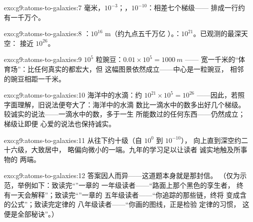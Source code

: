 \begin{solution}{exo:g9:atoms-to-galaxies:7}
毫米，$10^{-3}$；，$10^{-10}$：相差七个梯级——
排成一行约有一千万个。
\end{solution}

\begin{solution}{exo:g9:atoms-to-galaxies:8}
：$10^{16}$ \unit{m}（约九点五千万亿
）。：$10^{21}$。已观测的最深天空：
接近 $10^{26}$。
\end{solution}

\begin{solution}{exo:g9:atoms-to-galaxies:9}
$10^{5}$ 粒豌豆：$0.01 \times 10^{5} = \qty{1000}{m}$ ——
宽一千米的“体育场”：比任何真实的都宏大，但
这幅图景依然成立——中心是一粒豌豆，
相邻的豌豆相距一千米。
\end{solution}

\begin{solution}{exo:g9:atoms-to-galaxies:10}
海洋中的水滴：约 $10^{21} \times 10^{5} = 10^{26}$
——因此，若照字面理解，旧说法便夸大了：海洋中的水滴
数比一滴水中的数多出好几个梯级。
较诚实的说法——一滴水中的数，多于一生
所能数过的任何东西——仍然成立；梯级让即便
心爱的说法也保持诚实。
\end{solution}

\begin{solution}{exo:g9:atoms-to-galaxies:11}
从往下约十级（自 $10^{0}$ 到 $10^{-10}$），
向上直到深空约二十六级，大致居中，
略偏向微小的一端。九年的学习足以让读者
诚实地触及所事物的
两端。
\end{solution}

\begin{solution}{exo:g9:atoms-to-galaxies:12}
答案因人而异——这道题本身就是那封信。
（仅为示范，举例如下：致读完“”一章的
一年级读者——“路面上那个黑色的孪生者，
终有一天会解释”；致读完“”一章的
五年级读者——“你追踪的那些链，终将
变成含的公式”；致读完定律的
八年级读者——“你画的图线，正是检验
定律的习惯，
这便是全部秘诀”。）
\end{solution}

